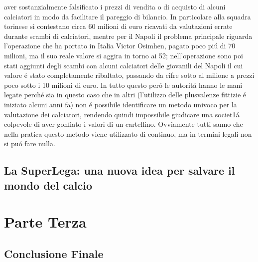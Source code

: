 \documentclass[
    corpo=12pt,
    oneside,
    evenboxes,
    tipotesi=triennale,
    stile=classica,
    oldstyle,
    autoretitolo,
    greek,
]{toptesi}
\begin{document}
\begin{interlinea}{1.5}
aver sostanzialmente falsificato i prezzi di vendita o di acquisto di alcuni calciatori in modo da facilitare il pareggio di bilancio.
In particolare alla squadra torinese si contestano circa 60 milioni di euro ricavati da valutazioni errate durante scambi di calciatori, mentre per 
il Napoli il problema principale riguarda l'operazione che ha portato in Italia Victor Osimhen, pagato poco pi\'u di 70 milioni, ma il suo reale 
valore si aggira in torno ai 52; nell'operazione sono poi stati aggiunti degli scambi con alcuni calciatori delle giovanili del Napoli il cui
valore \'e stato completamente ribaltato, passando da cifre sotto al milione a prezzi poco sotto i 10 milioni di euro. In tutto questo per\'o
le autorit\'a hanno le mani legate perch\'e sia in questo caso che in altri (l'utilizzo delle plusvalenze fittizie \'e iniziato alcuni anni fa)
non \'e possibile identificare un metodo univoco per la valutazione dei calciatori, rendendo quindi impossibile giudicare una societ1\'a
colpevole di aver gonfiato i valori di un cartellino. Ovviamente tutti sanno che nella pratica questo metodo viene utilizzato di continuo,
ma in termini legali non si pu\'o fare nulla.\newline
\chapter{La SuperLega: una nuova idea per salvare il mondo del calcio}
\part{Parte Terza}
\chapter{Conclusione Finale}
\end{interlinea}
\end{document}
